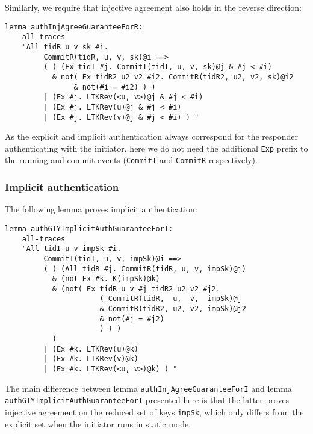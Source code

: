 Similarly, we require that injective agreement also holds in the
reverse direction:

\begin{lstlisting}
lemma authInjAgreeGuaranteeForR:
    all-traces
    "All tidR u v sk #i.
         CommitR(tidR, u, v, sk)@i ==>
         ( ( (Ex tidI #j. CommitI(tidI, u, v, sk)@j & #j < #i)
           & not( Ex tidR2 u2 v2 #i2. CommitR(tidR2, u2, v2, sk)@i2
                & not(#i = #i2) ) )
         | (Ex #j. LTKRev(<u, v>)@j & #j < #i)
         | (Ex #j. LTKRev(u)@j & #j < #i)
         | (Ex #j. LTKRev(v)@j & #j < #i) ) "
\end{lstlisting}

As the explicit and implicit authentication always correspond for the
responder authenticating with the initiator, here we do not need the
additional \lstinline{Exp} prefix to the running and commit events
(\lstinline{CommitI} and \lstinline{CommitR} respectively).

\subsubsection{Implicit authentication}

The following lemma proves implicit authentication:
\begin{lstlisting}
lemma authGIYImplicitAuthGuaranteeForI:
    all-traces
    "All tidI u v impSk #i.
         CommitI(tidI, u, v, impSk)@i ==>
         ( ( (All tidR #j. CommitR(tidR, u, v, impSk)@j)
           & (not Ex #k. K(impSk)@k)
           & (not( Ex tidR u v #j tidR2 u2 v2 #j2.
                      ( CommitR(tidR,  u,  v,  impSk)@j
                      & CommitR(tidR2, u2, v2, impSk)@j2
                      & not(#j = #j2)
                      ) ) )
           )
         | (Ex #k. LTKRev(u)@k)
         | (Ex #k. LTKRev(v)@k)
         | (Ex #k. LTKRev(<u, v>)@k) ) "
\end{lstlisting}

The main difference between lemma
\lstinline{authInjAgreeGuaranteeForI} and lemma\\
\lstinline{authGIYImplicitAuthGuaranteeForI} presented here is that
the latter proves injective agreement on the reduced set of keys
\lstinline{impSk}, which only differs from the explicit set when the
initiator runs in static mode.


